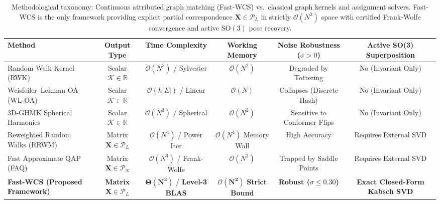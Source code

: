 \documentclass[a4paper,fleqn]{cas-dc}
\theoremstyle{thmstyleone}
\theoremstyle{thmstyletwo}
\theoremstyle{thmstylethree}
\begin{document}
\begin{table}
\centering
\small
\caption{Methodological taxonomy: Continuous attributed graph matching (Fast-WCS) vs.\ classical graph kernels and assignment solvers. Fast-WCS is the only framework providing explicit partial correspondence $\mathbf{X} \in \mathcal{P}_L$ in strictly $\mathcal{O}(N^2)$ space with certified Frank-Wolfe convergence and active $\mathrm{SO}(3)$ pose recovery.}
\label{tab:kernel_comparison}
\setlength{\tabcolsep}{6pt}
\begin{tabular*}{\textwidth}{@{\extracolsep{\fill}}lccccc@{}}
\toprule
\textbf{Method} & \textbf{Output Type} & \textbf{Time Complexity} & \textbf{Working Memory} & \textbf{Noise Robustness ($\sigma > 0$)} & \textbf{Active SO(3) Superposition} \\
\midrule
Random Walk Kernel (RWK)~\cite{vishwanathan2010} & Scalar $\mathcal{K} \in \mathbb{R}$ & $\mathcal{O}(N^3)$ / Sylvester & $\mathcal{O}(N^2)$ & Degraded by Tottering & No (Invariant Only) \\
Weisfeiler--Lehman OA (WL-OA)~\cite{kriege2016valid} & Scalar $\mathcal{K} \in \mathbb{R}$ & $\mathcal{O}(h|E|)$ / Linear & $\mathcal{O}(N)$ & Collapses (Discrete Hash) & No (Invariant Only) \\
3D-GHMK Spherical Harmonics~\cite{mahe2005graph} & Scalar $\mathcal{K} \in \mathbb{R}$ & $\mathcal{O}(N^3)$ / Spherical & $\mathcal{O}(N^2)$ & Sensitive to Conformer Flips & No (Invariant Only) \\
Reweighted Random Walks (RRWM)~\cite{cho2010rrwm} & Matrix $\mathbf{X} \in \mathcal{P}_L$ & $\mathcal{O}(N^4)$ / Power Iter & $\mathcal{O}(N^4)$ Memory Wall & High Accuracy & Requires External SVD \\
Fast Approximate QAP (FAQ)~\cite{vogelstein2015fast} & Matrix $\mathbf{X} \in \mathcal{P}_N$ & $\mathcal{O}(N^3)$ / Frank-Wolfe & $\mathcal{O}(N^2)$ & Trapped by Saddle Points & Requires External SVD \\
\textbf{Fast-WCS (Proposed Framework)} & \textbf{Matrix $\mathbf{X} \in \mathcal{P}_L$} & $\mathbf{\Theta(N^3)}$ / \textbf{Level-3 BLAS} & $\mathbf{\mathcal{O}(N^2)}$ \textbf{Strict Bound} & \textbf{Robust ($\sigma \le 0.30$)} & \textbf{Exact Closed-Form Kabsch SVD} \\
\bottomrule
\end{tabular*}
\end{table}

\end{document}
